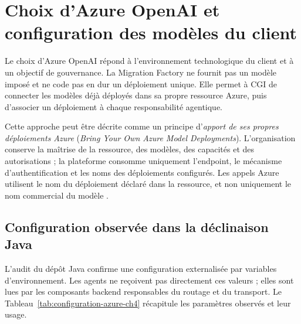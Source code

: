 \section{Choix d'Azure OpenAI et configuration des modèles du client}

Le choix d'Azure OpenAI répond à l'environnement technologique du client et à un objectif de gouvernance. La Migration Factory ne fournit pas un modèle imposé et ne code pas en dur un déploiement unique. Elle permet à CGI de connecter les modèles déjà déployés dans sa propre ressource Azure, puis d'associer un déploiement à chaque responsabilité agentique.

Cette approche peut être décrite comme un principe d'\textit{apport de ses propres déploiements Azure} (\textit{Bring Your Own Azure Model Deployments}). L'organisation conserve la maîtrise de la ressource, des modèles, des capacités et des autorisations ; la plateforme consomme uniquement l'endpoint, le mécanisme d'authentification et les noms des déploiements configurés. Les appels Azure utilisent le nom du déploiement déclaré dans la ressource, et non uniquement le nom commercial du modèle \cite{azure-foundry-endpoints}.

\subsection{Configuration observée dans la déclinaison Java}

L'audit du dépôt Java confirme une configuration externalisée par variables d'environnement. Les agents ne reçoivent pas directement ces valeurs ; elles sont lues par les composants backend responsables du routage et du transport. Le Tableau~\ref{tab:configuration-azure-ch4} récapitule les paramètres observés et leur usage.

